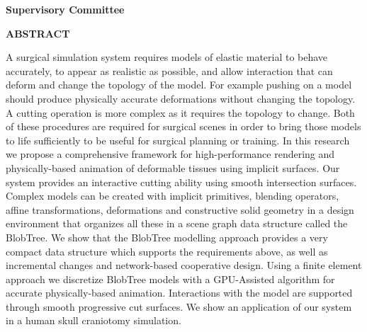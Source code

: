 \pagebreak
\newpage
{}

\noindent \textbf{Supervisory Committee}
\tpbreak
\panel

\begin{center}
\textbf{ABSTRACT}
\end{center}
A surgical simulation system requires models of elastic material to behave 
accurately, to appear as realistic as possible, and allow interaction that can 
deform and change the topology of the model.
 For example pushing on a model  should produce physically accurate deformations without changing the topology. 
 A cutting operation is 
more complex as it requires the  topology to change. Both of these procedures are required 
for surgical scenes in order to bring those models to life sufficiently to be useful for surgical planning or
training.
In this research we propose a comprehensive framework for high-performance rendering
and physically-based animation of deformable  tissues using implicit surfaces.
Our system provides an interactive cutting ability using smooth intersection surfaces.
Complex models can be created with implicit primitives, blending operators, affine
transformations, deformations and constructive solid geometry in a design environment that organizes
all these in a scene graph data structure called the BlobTree. We show that the
BlobTree modelling approach provides a very compact data structure which supports 
the requirements above, as well as 
incremental changes and network-based cooperative design.
Using a finite element approach we discretize BlobTree models with a GPU-Assisted
algorithm for accurate physically-based animation. Interactions with the model are
supported through smooth progressive cut surfaces. We show an application of our
system in a human skull craniotomy simulation.


\pagebreak



